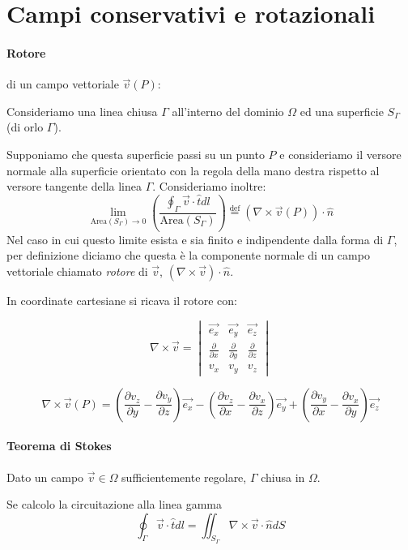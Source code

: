 \section{Campi conservativi e rotazionali}
\paragraph{Rotore} di un campo vettoriale $\vec{v}(P)$:

Consideriamo una linea chiusa $\Gamma$ all'interno del dominio $\Omega$ ed una superficie
$S_\Gamma$ (di orlo $\Gamma$).

Supponiamo che questa superficie passi su un punto $P$ e consideriamo il versore normale alla 
superficie orientato con la regola della mano destra rispetto al versore tangente della linea $\Gamma$.
Consideriamo inoltre:
$$
\lim_{\text{Area}(S_\Gamma)\to 0}\left(\frac{\oint_{\Gamma} \vec{v}\cdot\hat{t}dl}{\text{Area}(S_\Gamma)}\right) \stackrel{\text{def}}{=} \left(\nabla\times\vec{v}(P)\right)\cdot\hat{n}
$$
Nel caso in cui questo limite esista e sia finito e indipendente dalla forma di $\Gamma$, per definizione
diciamo che questa è la componente normale di un campo vettoriale chiamato \textit{rotore} di $\vec{v}$,
$(\nabla \times \vec{v})\cdot \hat{n}$.

In coordinate cartesiane si ricava il rotore con:

$$
\nabla \times \vec{v} =
\begin{vmatrix}
\vec{e_x} & \vec{e_y} & \vec{e_z} \\
\frac{\partial}{\partial x} & \frac{\partial}{\partial y} & \frac{\partial}{\partial z} \\
v_x & v_y & v_z
\end{vmatrix}
$$

$$
\nabla\times{\vec{v}}(P) = \left(\frac{\partial v_z}{\partial y} - \frac{\partial v_y}{\partial z}\right)\vec{e_x} -
\left(\frac{\partial v_z}{\partial x} - \frac{\partial v_x}{\partial z}\right)\vec{e_y} +
\left(\frac{\partial v_y}{\partial x} - \frac{\partial v_x}{\partial y}\right)\vec{e_z}
$$

\paragraph{Teorema di Stokes}
Dato un campo $\vec{v} \in \Omega$ sufficientemente regolare, $\Gamma$ chiusa in $\Omega$.

Se calcolo la circuitazione alla linea gamma
$$
\oint_\Gamma \vec{v}\cdot\hat{t} dl = \iint_{S_\Gamma} \nabla\times \vec{v} \cdot \hat{n} dS
$$

